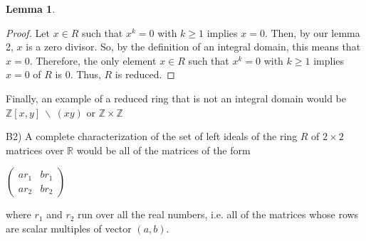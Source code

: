\documentclass[executivepaper]{article}
\newtheorem{lemma}{Lemma}
\begin{document}
\begin{flushleft}
\begin{lemma}
\end{lemma}

\begin{proof}

Let $x \in R$ such that $x^{k}=0$ with $k \geq 1$ implies $x=0$. Then, by our lemma 2, $x$ is a zero divisor. So, by the definition of an integral domain, this means that $x=0$. Therefore, the only element $x \in R$ such that $x^{k}=0$ with $k \geq 1$ implies $x=0$ of $R$ is 0. Thus, $R$ is reduced.

\end{proof}

Finally, an example of a reduced ring that is not an integral domain would be $\mathbb{Z}\left[x,y\right] ~ \backslash ~ (xy)$ or $\mathbb{Z} \times \mathbb{Z}$

\end{flushleft}

\vspace{5mm}

\begin{flushleft}

B2) A complete characterization of the set of left ideals of the ring $R$ of $2 \times 2$ matrices over $\mathbb{R}$ would be all of the matrices of the form

\begin{center}

$\begin{pmatrix}

ar_{1} & br_{1}\\

ar_{2} & br_{2}

\end{pmatrix}$ 

\end{center}

where $r_{1}$ and $r_{2}$ run over all the real numbers, i.e. all of the matrices whose rows are scalar multiples of vector $(a,b)$. 

\end{flushleft}
\end{document}
